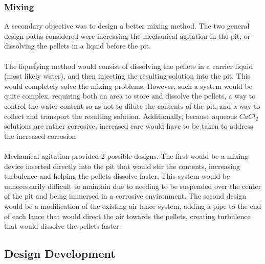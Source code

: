 \documentclass[10pt]{project}
\begin{document}
\subsubsection{Mixing}%
\label{sec:Ideation-Mixer}
A secondary objective was to design a better mixing method.  The two general design paths considered were increasing the mechanical agitation in the pit, or dissolving the pellets in a liquid before the pit.\\\\  The liquefying method would consist of dissolving the pellets in a carrier liquid (most likely water), and then injecting the resulting solution into the pit.  This would completely solve the mixing problems.  However, such a system would be quite complex, requiring both an area to store and dissolve the pellets, a way to control the water content so as not to dilute the contents of the pit, and a way to collect and transport the resulting solution.  Additionally, because aqueous $CaCl_2$ solutions are rather corrosive, increased care would have to be taken to address the increased corrosion
\\\\
Mechanical agitation provided 2 possible designs.  The first would be a mixing device inserted directly into the pit that would stir the contents, increasing turbulence and helping the pellets dissolve faster.  This system would be unnecessarily difficult to maintain due to needing to be suspended over the center of the pit and being immersed in a corrosive environment.  The second design would be a modification of the existing air lance system, adding a pipe to the end of each lance that would direct the air towards the pellets, creating turbulence that would dissolve the pellets faster.
\subsection{Design Development} \label{sec:designDev}
\end{document}
